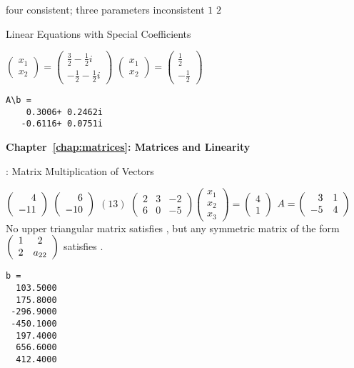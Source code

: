  \ans four 
 \ans consistent; three parameters
 \ans inconsistent
 \ans $1$
 \ans $2$

 Linear Equations with Special Coefficients

$\left(\begin{array}{c} x_1 \\ x_2\end{array}\right) =
\left(\begin{array}{r} \frac{3}{2} - \frac{1}{2}i \\ -\frac{1}{2} -
\frac{1}{2}i\end{array}\right)$
$\left(\begin{array}{c} x_1 \\ x_2\end{array}\right) =
\left(\begin{array}{r} \frac{1}{2} \\ -\frac{1}{2} \end{array}\right)$
\begin{verbatim}
A\b =
    0.3006+ 0.2462i
   -0.6116+ 0.0751i
\end{verbatim}


\vspace{0.08in}
{\bf Chapter~\ref{chap:matrices}: Matrices and Linearity}

: Matrix Multiplication of Vectors

  $\left(\begin{array}{r} 4 \\ -11\end{array}\right)$
 $\left(\begin{array}{r} 6 \\ -10\end{array}\right)$
 $\left(13\right)$
$\left(\begin{array}{rrr} 2 & 3 & -2 \\ 6 & 0 & -5\end{array}\right) 
\left(\begin{array}{r} x_1 \\ x_2 \\ x_3\end{array}\right) = 
\left(\begin{array}{r} 4 \\ 1\end{array}\right)$
\ans $A = \left(\begin{array}{rr} 3 & 1\\ -5 &4\end{array}\right)$
\ans No upper triangular matrix satisfies , but any 
symmetric matrix of the form $\left(\begin{array}{cc} 1 & 2\\ 2 &a_{22}\end{array}\right)$ 
satisfies .
\begin{verbatim}
b =
  103.5000
  175.8000
 -296.9000
 -450.1000
  197.4000
  656.6000
  412.4000
\end{verbatim}

